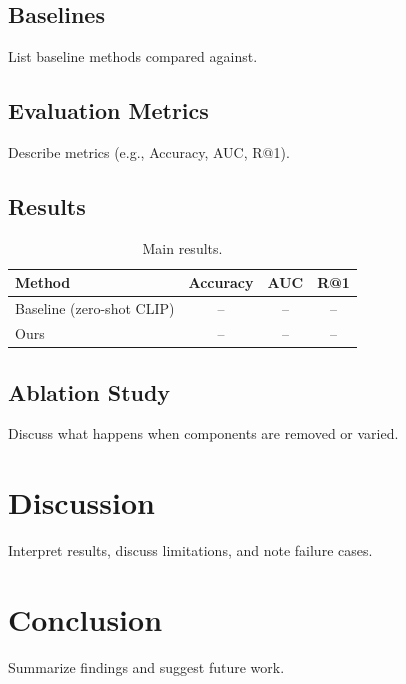 \documentclass[11pt]{article}
\begin{document}
\subsection{Baselines}
List baseline methods compared against.

\subsection{Evaluation Metrics}
Describe metrics (e.g., Accuracy, AUC, R@1).

\subsection{Results}

\begin{table}[h]
\centering
\caption{Main results.}
\label{tab:main_results}
\begin{tabular}{lccc}
\toprule
Method & Accuracy & AUC & R@1 \\
\midrule
Baseline (zero-shot CLIP) & -- & -- & -- \\
Ours & -- & -- & -- \\
\bottomrule
\end{tabular}
\end{table}

\subsection{Ablation Study}
Discuss what happens when components are removed or varied.

\section{Discussion}
Interpret results, discuss limitations, and note failure cases.

\section{Conclusion}
Summarize findings and suggest future work.



\end{document}
